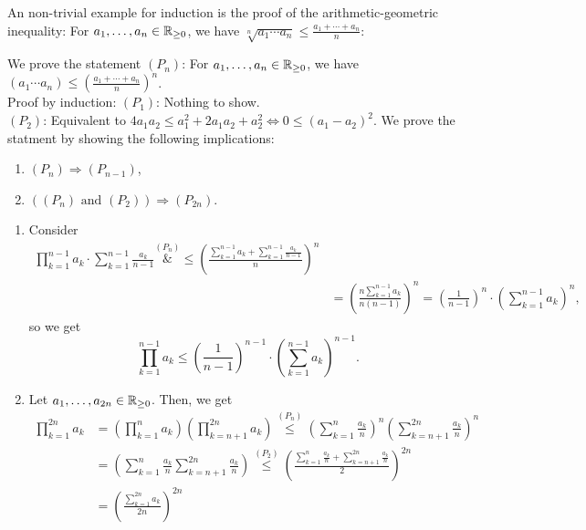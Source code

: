 \documentclass[language=english]{../../Template/TemplateLecture}
\begin{document}
\begin{enumerate}[$(i)$]
    An non-trivial example for induction is the proof of the arithmetic-geometric inequality: For $a_1, \ldots, a_n \in \mathbb{R}_{\geq 0}$, we have $\sqrt[n]{a_1 \cdots a_n} \leq \frac{a_1 + \cdots + a_n}{n}$:

    We prove the statement $(P_n)$: For $a_1, \ldots, a_n \in \mathbb{R}_{\geq 0}$, we have $(a_1 \cdots a_n) \leq \left(\frac{a_1 + \cdots + a_n}{n}\right)^n$. \\
    Proof by induction: $(P_1)$: Nothing to show. \\
    $(P_2)$: Equivalent to $4a_1 a_2 \leq a_1^2 + 2a_1 a_2 + a_2^2 \iff 0 \leq (a_1 - a_2)^2$. We prove the statment by showing the following implications:
    \begin{enumerate}[$(a)$]
        \item $(P_n) \Rightarrow (P_{n-1})$,
        \item $((P_n) \text{ and } (P_2)) \Rightarrow (P_{2n})$.
    \end{enumerate}
    \begin{enumerate}[$(a)$:]
        \item Consider
        \begin{equation}
            \begin{split}
                \prod_{k = 1}^{n-1} a_k \cdot \sum_{k = 1}^{n-1} \frac{a_k}{n-1} \overset{(P_n)}&{\leq} \left(\frac{\sum_{k = 1}^{n-1} a_k + \sum_{k = 1}^{n-1} \frac{a_k}{n-1}}{n}\right)^n \\
                &= \left(\frac{n \sum_{k = 1}^{n-1} a_k}{n(n-1)}\right)^n = \left(\frac{1}{n-1}\right)^n \cdot \left(\sum_{k = 1}^{n-1} a_k\right)^n,
            \end{split}
        \end{equation}
        so we get 
        \begin{equation}
            \prod_{k = 1}^{n-1} a_k \leq \left(\frac{1}{n-1}\right)^{n-1} \cdot \left(\sum_{k = 1}^{n-1} a_k\right)^{n-1}.
        \end{equation}
        \item Let $a_1, \ldots, a_{2n} \in \mathbb{R}_{\geq 0}$. Then, we get 
        \begin{equation}
            \begin{split}
                \prod_{k = 1}^{2n} a_k &= \left(\prod_{k = 1}^n a_k\right)\left(\prod_{k = n + 1}^{2n} a_k\right) \overset{(P_n)}{\leq} \left(\sum_{k = 1}^n \frac{a_k}{n}\right)^n \left(\sum_{k = n + 1}^{2n} \frac{a_k}{n}\right)^n \\
                &= \left(\sum_{k = 1}^n \frac{a_k}{n} \sum_{k = n + 1}^{2n} \frac{a_k}{n}\right) \overset{(P_2)}{\leq} \left(\frac{\sum_{k = 1}^n \frac{a_k}{n} + \sum_{k = n + 1}^{2n} \frac{a_k}{n}}{2}\right)^{2n} \\
                &= \left(\frac{\sum_{k = 1}^{2n} a_k}{2n}\right)^{2n}
            \end{split}
        \end{equation}
    \end{enumerate}
\end{enumerate}
\end{document}
